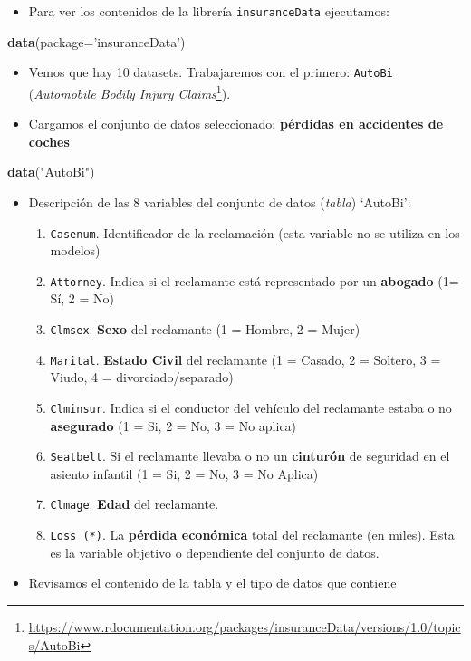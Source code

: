 \documentclass[]{book}
\newenvironment{Shaded}{\begin{snugshade}}{\end{snugshade}}
\newcommand{\DataTypeTok}[1]{\textcolor[rgb]{0.13,0.29,0.53}{#1}}
\newcommand{\KeywordTok}[1]{\textcolor[rgb]{0.13,0.29,0.53}{\textbf{#1}}}
\newcommand{\NormalTok}[1]{#1}
\newcommand{\StringTok}[1]{\textcolor[rgb]{0.31,0.60,0.02}{#1}}
\providecommand{\tightlist}{%
  \setlength{\itemsep}{0pt}\setlength{\parskip}{0pt}}
\let\rmarkdownfootnote\footnote%
\def\footnote{\protect\rmarkdownfootnote}
\begin{document}
\begin{itemize}
\tightlist
\item
  Para ver los contenidos de la librería \texttt{insuranceData} ejecutamos:
\end{itemize}

\begin{Shaded}
\begin{Highlighting}[]
\KeywordTok{data}\NormalTok{(}\DataTypeTok{package=}\StringTok{'insuranceData'}\NormalTok{)}
\end{Highlighting}
\end{Shaded}

\begin{itemize}
\item
  Vemos que hay 10 datasets. Trabajaremos con el primero: \texttt{AutoBi} (\emph{Automobile Bodily Injury Claims}\footnote{\url{https://www.rdocumentation.org/packages/insuranceData/versions/1.0/topics/AutoBi}}).
\item
  Cargamos el conjunto de datos seleccionado: \textbf{pérdidas en accidentes de coches}
\end{itemize}

\begin{Shaded}
\begin{Highlighting}[]
\KeywordTok{data}\NormalTok{(}\StringTok{"AutoBi"}\NormalTok{)}
\end{Highlighting}
\end{Shaded}

\begin{itemize}
\item
  Descripción de las 8 variables del conjunto de datos (\emph{tabla}) `AutoBi':

  \begin{enumerate}
  \def\labelenumi{\arabic{enumi}.}
  \tightlist
  \item
    \texttt{Casenum}. Identificador de la reclamación (esta variable no se utiliza en los modelos)
  \item
    \texttt{Attorney}. Indica si el reclamante está representado por un \textbf{abogado} (1= Sí, 2 = No)
  \item
    \texttt{Clmsex}. \textbf{Sexo} del reclamante (1 = Hombre, 2 = Mujer)
  \item
    \texttt{Marital}. \textbf{Estado Civil} del reclamante (1 = Casado, 2 = Soltero, 3 = Viudo, 4 = divorciado/separado)
  \item
    \texttt{Clminsur}. Indica si el conductor del vehículo del reclamante estaba o no \textbf{asegurado} (1 = Si, 2 = No, 3 = No aplica)
  \item
    \texttt{Seatbelt}. Si el reclamante llevaba o no un \textbf{cinturón} de seguridad en el asiento infantil (1 = Si, 2 = No, 3 = No Aplica)
  \item
    \texttt{Clmage}. \textbf{Edad} del reclamante.
  \item
    \texttt{Loss\ (*)}. La \textbf{pérdida económica} total del reclamante (en miles). Esta es la variable objetivo o dependiente del conjunto de datos.
  \end{enumerate}
\item
  Revisamos el contenido de la tabla y el tipo de datos que contiene
\end{itemize}
\end{document}
